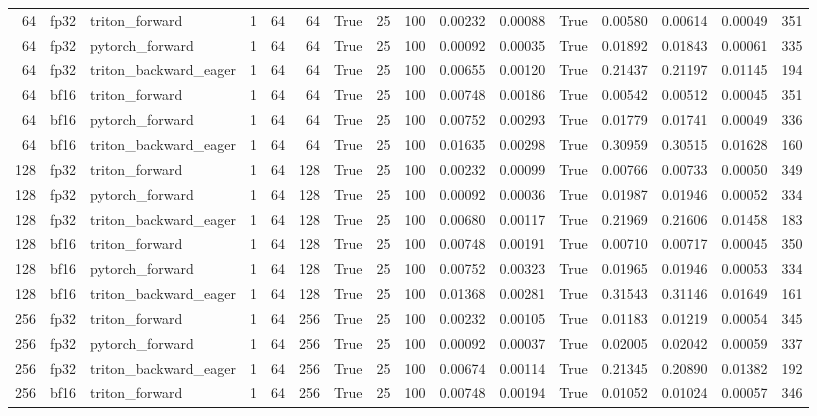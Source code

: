 \begin{tabular}{rllrrrrrrrrrrrrr}
64 & fp32 & triton\_forward & 1 & 64 & 64 & True & 25 & 100 & 0.00232 & 0.00088 & True & 0.00580 & 0.00614 & 0.00049 & 351 \\
64 & fp32 & pytorch\_forward & 1 & 64 & 64 & True & 25 & 100 & 0.00092 & 0.00035 & True & 0.01892 & 0.01843 & 0.00061 & 335 \\
64 & fp32 & triton\_backward\_eager & 1 & 64 & 64 & True & 25 & 100 & 0.00655 & 0.00120 & True & 0.21437 & 0.21197 & 0.01145 & 194 \\
64 & bf16 & triton\_forward & 1 & 64 & 64 & True & 25 & 100 & 0.00748 & 0.00186 & True & 0.00542 & 0.00512 & 0.00045 & 351 \\
64 & bf16 & pytorch\_forward & 1 & 64 & 64 & True & 25 & 100 & 0.00752 & 0.00293 & True & 0.01779 & 0.01741 & 0.00049 & 336 \\
64 & bf16 & triton\_backward\_eager & 1 & 64 & 64 & True & 25 & 100 & 0.01635 & 0.00298 & True & 0.30959 & 0.30515 & 0.01628 & 160 \\
128 & fp32 & triton\_forward & 1 & 64 & 128 & True & 25 & 100 & 0.00232 & 0.00099 & True & 0.00766 & 0.00733 & 0.00050 & 349 \\
128 & fp32 & pytorch\_forward & 1 & 64 & 128 & True & 25 & 100 & 0.00092 & 0.00036 & True & 0.01987 & 0.01946 & 0.00052 & 334 \\
128 & fp32 & triton\_backward\_eager & 1 & 64 & 128 & True & 25 & 100 & 0.00680 & 0.00117 & True & 0.21969 & 0.21606 & 0.01458 & 183 \\
128 & bf16 & triton\_forward & 1 & 64 & 128 & True & 25 & 100 & 0.00748 & 0.00191 & True & 0.00710 & 0.00717 & 0.00045 & 350 \\
128 & bf16 & pytorch\_forward & 1 & 64 & 128 & True & 25 & 100 & 0.00752 & 0.00323 & True & 0.01965 & 0.01946 & 0.00053 & 334 \\
128 & bf16 & triton\_backward\_eager & 1 & 64 & 128 & True & 25 & 100 & 0.01368 & 0.00281 & True & 0.31543 & 0.31146 & 0.01649 & 161 \\
256 & fp32 & triton\_forward & 1 & 64 & 256 & True & 25 & 100 & 0.00232 & 0.00105 & True & 0.01183 & 0.01219 & 0.00054 & 345 \\
256 & fp32 & pytorch\_forward & 1 & 64 & 256 & True & 25 & 100 & 0.00092 & 0.00037 & True & 0.02005 & 0.02042 & 0.00059 & 337 \\
256 & fp32 & triton\_backward\_eager & 1 & 64 & 256 & True & 25 & 100 & 0.00674 & 0.00114 & True & 0.21345 & 0.20890 & 0.01382 & 192 \\
256 & bf16 & triton\_forward & 1 & 64 & 256 & True & 25 & 100 & 0.00748 & 0.00194 & True & 0.01052 & 0.01024 & 0.00057 & 346 \\

\end{tabular}
